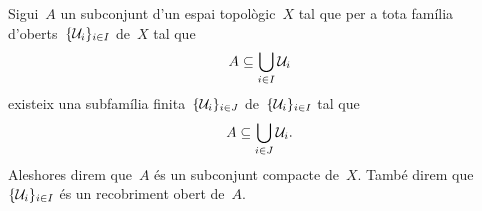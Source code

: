\documentclass[../../main.tex]{subfiles}
\begin{document}
    \begin{definition}
        \label{def:compacitat d'un subconjunt}
        \label{def:subconjunt compacte}
        \label{def:recobriment obert d'un subconjunt}
        Sigui~\(A\) un subconjunt d'un espai topològic~\(X\) tal que per a tota família d'oberts~\(\{\mathcal{U}_{i}\}_{i\in I}\) de~\(X\) tal que
        \[
            A\subseteq\bigcup_{i\in I}\mathcal{U}_{i}
        \]
        existeix una subfamília finita~\(\{\mathcal{U}_{i}\}_{i\in J}\) de~\(\{\mathcal{U}_{i}\}_{i\in I}\) tal que
        \[
            A\subseteq\bigcup_{i\in J}\mathcal{U}_{i}.
        \]
        Aleshores direm que~\(A\) és un subconjunt compacte de~\(X\).
        També direm que~\(\{\mathcal{U}_{i}\}_{i\in I}\) és un recobriment obert de~\(A\).
    \end{definition}
\end{document}
